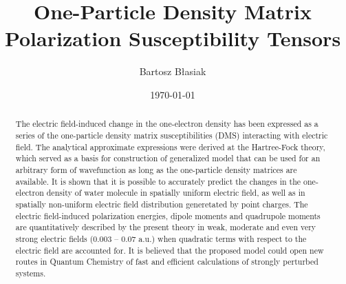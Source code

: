 \documentclass[aip,amsmath,amssymb,reprint,floatfix]{revtex4-1}
\begin{document}

\title{One-Particle Density Matrix Polarization Susceptibility Tensors}

\author{Bartosz B{\l}asiak}

\date{\today}

\begin{abstract}


The electric field\hyp{}induced change in the one\hyp{}electron density
has been expressed as a series of the one\hyp{}particle density matrix susceptibilities (DMS)
interacting with electric field.
The analytical approximate expressions were derived
at the Hartree\hyp{}Fock theory, which served as a basis for construction of generalized
model that can be used for an arbitrary form of wavefunction as long as the one\hyp{}particle
density matrices are available. It is shown that it is possible to accurately predict the changes
in the one\hyp{}electron density of water molecule in spatially uniform electric field, as well as
in spatially non\hyp{}uniform electric field distribution
generetated by point charges. The electric field\hyp{}induced polarization energies,
dipole moments and quadrupole moments are quantitatively described by the present theory 
in weak, moderate and even very strong electric fields (0.003 -- 0.07 a.u.)
when quadratic terms with respect to the electric field are accounted for.
It is believed that the proposed model could open
new routes in Quantum Chemistry of fast and efficient calculations of strongly perturbed systems.
\end{abstract}

\pacs{}%

\maketitle %
\end{document}
